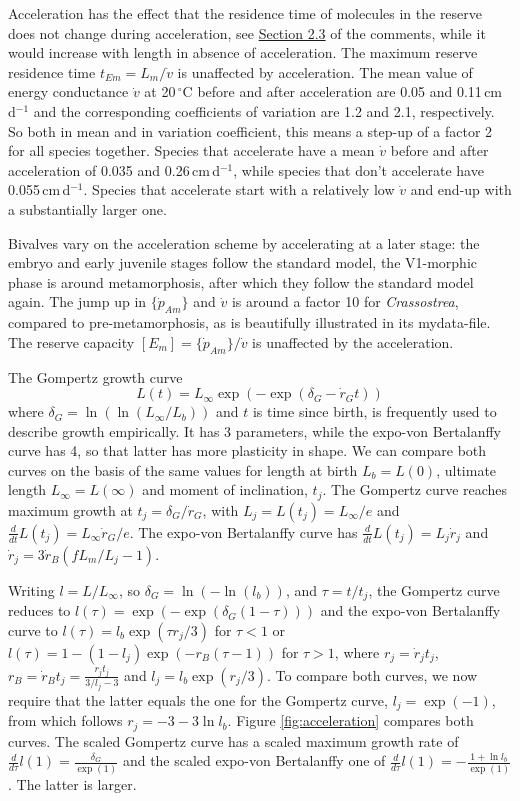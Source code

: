 Acceleration has the effect that the residence time of molecules in the reserve does not change during acceleration, see \hyperref[sec_c_b:reserve_dynamics]{Section 2.3} of the comments, while it would increase with length in absence of acceleration.
The maximum reserve residence time $t_{Em} = L_m/ \dot{v}$ is unaffected by acceleration.
The mean value of energy conductance $\dot{v}$ at 20\,$^\circ$C before and after acceleration are 0.05 and 0.11\,cm\,d$^{-1}$ and the corresponding coefficients of variation are 1.2 and 2.1, respectively.
So both in mean and in variation coefficient, this means a step-up of a factor 2 for all species together.
Species that accelerate have a mean $\dot{v}$ before and after acceleration of 0.035 and 0.26\,cm\,d$^{-1}$, while species that don't accelerate have 0.055\,cm\,d$^{-1}$.
Species that accelerate start with a relatively low $\dot{v}$ and end-up with a substantially larger one.

Bivalves vary on the acceleration scheme by accelerating at a later stage:
the embryo and early juvenile stages follow the standard model, the V1-morphic phase is around metamorphosis, after which they follow the standard model again. 
The jump up in $\{\dot{p}_{Am}\}$ and $\dot{v}$ is around a factor 10 for \emph{Crassostrea}, compared to pre-metamorphosis, as is beautifully illustrated in its mydata-file.
The reserve capacity $[E_m] = \{\dot{p}_{Am}\}/ \dot{v}$ is unaffected by the acceleration.

The Gompertz growth curve 
\[
  L(t) = L_\infty \exp(-\exp(\delta_G - \dot{r}_G t))
\]
where $\delta_G = \ln(\ln(L_\infty/ L_b))$ and $t$ is time since birth, is frequently used to describe growth empirically.
It has 3 parameters, while the expo-von Bertalanffy curve has 4, so that latter has more plasticity in shape.
We can compare both curves on the basis of the same values for length at birth $L_b = L(0)$, ultimate length $L_\infty = L(\infty)$ and moment of inclination, $t_j$.
The Gompertz curve reaches maximum growth at $t_j = \delta_G/ \dot{r}_G$, with $L_j = L(t_j) = L_\infty/ e$ and $\frac{d} {dt} L(t_j) = L_\infty \dot{r}_G/ e$.
The expo-von Bertalanffy curve has $\frac{d} {dt} L(t_j) = L_j \dot{r}_j$ and $\dot{r}_j = 3 \dot{r}_B (f L_m/ L_j - 1)$.

Writing $l = L/ L_\infty$, so $\delta_G = \ln( - \ln(l_b))$, and $\tau = t/ t_j$, the Gompertz curve reduces to $l(\tau) = \exp(-\exp(\delta_G (1 - \tau)))$ and the expo-von Bertalanffy curve to $l(\tau) = l_b \exp( \tau r_j/ 3)$ for $\tau < 1$ or $l(\tau) = 1 - (1 - l_j) \exp( -r_B (\tau - 1))$ for $\tau > 1$, where $r_j = \dot{r}_j t_j$, $r_B = \dot{r}_B t_j = \frac{r_j t_j} {3/ l_j - 3}$ and $l_j = l_b \exp(r_j/ 3)$.
To compare both curves, we now require that the latter equals the one for the Gompertz curve, $l_j = \exp(-1)$, from which follows $r_j = -3 - 3 \ln l_b$.
Figure \ref{fig:acceleration} compares both curves. 
The scaled Gompertz curve has a scaled maximum growth rate of $\frac{d} {d \tau} l (1) = \frac{\delta_G} {\exp(1)}$ and the scaled expo-von Bertalanffy one of $\frac{d} {d \tau} l (1) = - \frac{1 + \ln l_b} {\exp(1)}$.
The latter is larger.

